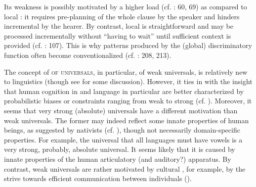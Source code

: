 \documentclass[output=paper]{langsci/langscibook}
\begin{document}
Its weakness is possibly motivated by a higher  load (cf. \citealt{Hawkins2014_CompMot}: 60, 69) as compared to local : it requires pre-planning of the whole clause by the speaker and hinders incremental  by the hearer. By contrast, local  is straightforward and may be processed incrementally without “having to wait” until sufficient context is provided (cf. \citealt{Bornkessel-SchlesewskySchlesewsky2014}: 107). This is why patterns produced by the (global) discriminatory function often become conventionalized (cf. \citealt{Aissen2003,ZeevatJäger2002,Jäger2004,Malchukov2008}: 208, 213).

The concept of \textsc{ of universals}, in particular, of weak universals, is relatively new to linguistics (though see \citealt{Bickel2013} for some discussion). However, it ties in with the insight that human cognition in  and language  in particular are better characterized by probabilistic biases or constraints ranging from weak to strong (cf. \citealt{ThompsonEtAl2016}). Moreover, it seems that very strong (absolute) universals have a different motivation than weak universals. The former may indeed reflect some innate properties of human beings, as suggested by nativists (cf. \citealt{Chomsky1965}), though not necessarily domain-specific properties. For example, the universal that all languages must have vowels \citep[19]{Comrie1989} is a very strong, probably, absolute universal. It seems likely that it is caused by innate properties of the human articulatory (and auditory?) apparatus. By contrast, weak universals are rather motivated by cultural , for example, by the strive towards efficient communication between individuals (). 
\newpage
\end{document}
